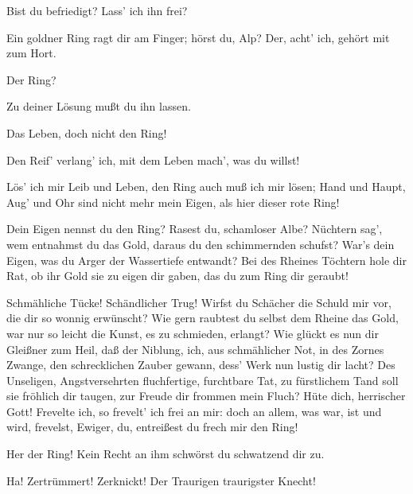 \begin{drama}

Bist du befriedigt? Lass' ich ihn frei?
 

\Wotanspeaks
Ein goldner Ring ragt dir am Finger;
hörst du, Alp?
Der, acht' ich, gehört mit zum Hort.
 

\Alberichspeaks


Der Ring?
 

\Wotanspeaks
Zu deiner Lösung mußt du ihn lassen.
 

\Alberichspeaks


Das Leben, doch nicht den Ring!
 

\Wotanspeaks


Den Reif' verlang' ich,
mit dem Leben mach', was du willst!
 

\Alberichspeaks
Lös' ich mir Leib und Leben,
den Ring auch muß ich mir lösen;
Hand und Haupt, Aug' und Ohr
sind nicht mehr mein Eigen,
als hier dieser rote Ring!
 

\Wotanspeaks
Dein Eigen nennst du den Ring?
Rasest du, schamloser Albe?
Nüchtern sag',
wem entnahmst du das Gold,
daraus du den schimmernden schufst?
War's dein Eigen, was du Arger
der Wassertiefe entwandt?
Bei des Rheines Töchtern hole dir Rat,
ob ihr Gold sie zu eigen dir gaben,
das du zum Ring dir geraubt!
 

\Alberichspeaks
Schmähliche Tücke! Schändlicher Trug!
Wirfst du Schächer die Schuld mir vor,
die dir so wonnig erwünscht?
Wie gern raubtest
du selbst dem Rheine das Gold,
war nur so leicht
die Kunst, es zu schmieden, erlangt?
Wie glückt es nun dir Gleißner zum Heil,
daß der Niblung, ich, aus schmählicher Not,
in des Zornes Zwange,
den schrecklichen Zauber gewann,
dess' Werk nun lustig dir lacht?
Des Unseligen, Angstversehrten
fluchfertige, furchtbare Tat,
zu fürstlichem Tand soll sie fröhlich dir taugen,
zur Freude dir frommen mein Fluch?
Hüte dich, herrischer Gott!
Frevelte ich, so frevelt' ich frei an mir:
doch an allem, was war,
ist und wird,
frevelst, Ewiger, du,
entreißest du frech mir den Ring!
 

\Wotanspeaks
Her der Ring!
Kein Recht an ihm
schwörst du schwatzend dir zu.
 




\Alberichspeaks
{}
Ha! Zertrümmert! Zerknickt!
Der Traurigen traurigster Knecht!
 


\end{drama}
